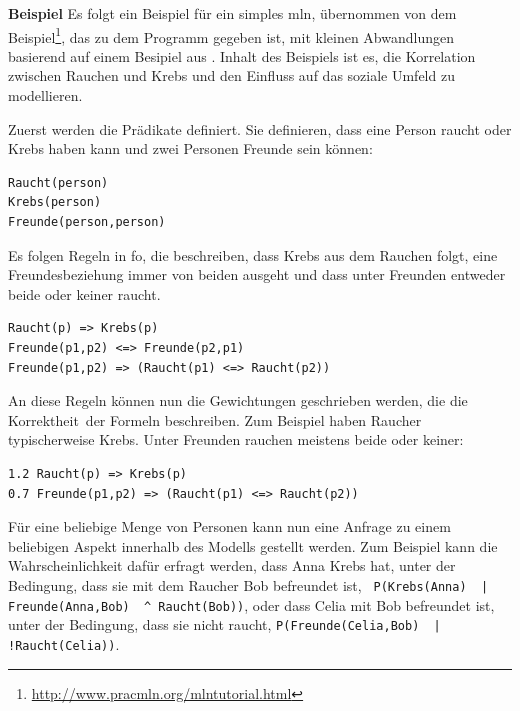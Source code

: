 \textbf{Beispiel}\label{mlnexample} Es folgt ein Beispiel für ein simples \gls{mln}, übernommen von dem Beispiel\footnote{\url{http://www.pracmln.org/mlntutorial.html}}, das zu dem Programm \pracmln gegeben ist, mit kleinen Abwandlungen basierend auf einem Besipiel aus \cite{nyga17}. Inhalt des Beispiels ist es, die Korrelation zwischen Rauchen und Krebs und den Einfluss auf das soziale Umfeld zu modellieren. \par
Zuerst werden die Prädikate definiert. Sie definieren, dass eine Person raucht oder Krebs haben kann und zwei Personen Freunde sein können:
\begin{lstlisting}[backgroundcolor=\color{backcolour}]
Raucht(person)
Krebs(person)
Freunde(person,person)
\end{lstlisting}
Es folgen Regeln in \gls{fo}, die beschreiben, dass Krebs aus dem Rauchen folgt, eine Freundesbeziehung immer von beiden ausgeht und dass unter Freunden entweder beide oder keiner raucht. 
\begin{lstlisting}[backgroundcolor=\color{backcolour}]
Raucht(p) => Krebs(p)
Freunde(p1,p2) <=> Freunde(p2,p1)
Freunde(p1,p2) => (Raucht(p1) <=> Raucht(p2))
\end{lstlisting}
An diese Regeln können nun die Gewichtungen geschrieben werden, die die \glqq Korrektheit\grqq \ der Formeln beschreiben. Zum Beispiel haben Raucher typischerweise Krebs. Unter Freunden rauchen meistens beide oder keiner:
\begin{lstlisting}[backgroundcolor=\color{backcolour}]
1.2 Raucht(p) => Krebs(p)
0.7 Freunde(p1,p2) => (Raucht(p1) <=> Raucht(p2))
\end{lstlisting}  
Für eine beliebige Menge von Personen kann nun eine Anfrage zu einem beliebigen Aspekt innerhalb des Modells  gestellt werden. Zum Beispiel kann die Wahrscheinlichkeit dafür erfragt werden, dass Anna Krebs hat, unter der Bedingung, dass sie mit dem Raucher Bob befreundet ist, \lstinline[breaklines=true]{ P(Krebs(Anna)  | Freunde(Anna,Bob)  ^ Raucht(Bob))}, oder dass Celia mit Bob befreundet ist, unter der Bedingung, dass sie nicht raucht, \lstinline[breaklines=true]{P(Freunde(Celia,Bob)  | !Raucht(Celia))}.


